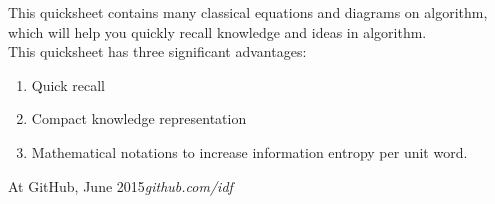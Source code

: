 %
%

\preface

This quicksheet contains many classical equations and diagrams on algorithm, which will help you quickly recall knowledge and ideas in algorithm.\\

This quicksheet has three significant advantages:
\begin{enumerate}
\item Quick recall
\item Compact knowledge representation
\item Mathematical notations to increase information entropy per unit word. 
\end{enumerate}

\vspace{\baselineskip}
\begin{flushright}\noindent
At GitHub, June 2015\hfill {\it github.com/idf} \\
\end{flushright}


